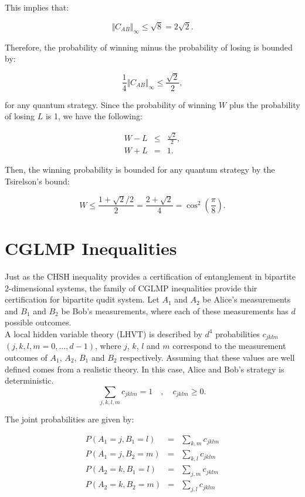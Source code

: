 \documentclass[12pt, letterpaper]{article}
\begin{document}
This implies that:

\[
\Vert C_{AB} \Vert_\infty \leq \sqrt{8} = 2\sqrt{2}.
\]

Therefore, the probability of winning minus the probability of losing is bounded by:

\[
\frac{1}{4}\Vert C_{AB}\Vert_\infty \leq \frac{\sqrt{2}}{2},
\]

for any quantum strategy. Since the probability of winning $W$ plus the probability of losing $L$ is 1, we have the following:

\begin{eqnarray*}
    W - L &\leq& \frac{\sqrt{2}}{2}, \\
    W + L &=& 1.
\end{eqnarray*}

Then, the winning probability is bounded for any quantum strategy by the Tsirelson's bound:

\[
W \leq \frac{1+\sqrt{2}/2}{2} = \frac{2 + \sqrt{2}}{4} = \cos^2\left( \frac{\pi}{8} \right).
\]


\newpage
\section{CGLMP Inequalities}

Just as the CHSH inequality provides a certification of entanglement in bipartite 2-dimensional systems, the family of CGLMP inequalities provide thir certification for bipartite qudit system. Let $A_1$ and $A_2$ be Alice's measurements and $B_1$ and $B_2$ be Bob's measurements, where each of these measurements has $d$ possible outcomes.\\

A local hidden variable theory (LHVT) is described by $d^4$ probabilities $c_{jklm}$ $(j,k,l,m = 0,\dots, d-1)$, where $j$, $k$, $l$ and $m$ correspond to the measurement outcomes of $A_1$, $A_2$, $B_1$ and $B_2$ respectively. Assuming that these values are well defined comes from a realistic theory. In this case, Alice and Bob's strategy is deterministic.
\[
\sum_{j,k,l,m} c_{jklm} = 1 \quad , \quad c_{jklm} \geq 0.
\]

The joint probabilities are given by:

\begin{eqnarray*}
    P(A_1 = j, B_1=l) &=& \sum_{k,m} c_{jklm} \\
    P(A_1 = j, B_2=m) &=& \sum_{k,l} c_{jklm} \\
    P(A_2 = k, B_1=l) &=& \sum_{j,m} c_{jklm} \\
    P(A_2 = k, B_2=m) &=& \sum_{j,l} c_{jklm} 
\end{eqnarray*}
\end{document}

